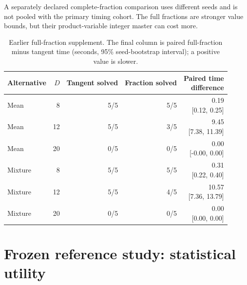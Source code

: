 \documentclass[11pt,a4paper]{article}
\begin{document}
A separately declared complete-fraction comparison uses different seeds and is not pooled with the primary timing cohort. The full fractions are stronger value bounds, but their product-variable integer master can cost more.
\begin{table}[htbp]\centering\small\setlength{\tabcolsep}{3.5pt}
\caption{Earlier full-fraction supplement. The final column is paired full-fraction minus tangent time (seconds, 95\% seed-bootstrap interval); a positive value is slower.}\label{tab:reference-ratio}
\begin{tabularx}{\linewidth}{@{}p{24mm}rrrr@{}}
\toprule Alternative & $D$ & Tangent solved & Fraction solved & \shortstack{Paired time\\difference} \\
\midrule
Mean & 8 & 5/5 & 5/5 & \shortstack{0.19\\{[0.12, 0.25]}} \\
Mean & 12 & 5/5 & 3/5 & \shortstack{9.45\\{[7.38, 11.39]}} \\
Mean & 20 & 0/5 & 0/5 & \shortstack{0.00\\{[-0.00, 0.00]}} \\
Mixture & 8 & 5/5 & 5/5 & \shortstack{0.31\\{[0.22, 0.40]}} \\
Mixture & 12 & 5/5 & 4/5 & \shortstack{10.57\\{[7.36, 13.79]}} \\
Mixture & 20 & 0/5 & 0/5 & \shortstack{0.00\\{[0.00, 0.00]}} \\
\bottomrule\end{tabularx}\end{table}


\FloatBarrier
\section{Frozen reference study: statistical utility}\label{sec:statistics}
\end{document}
